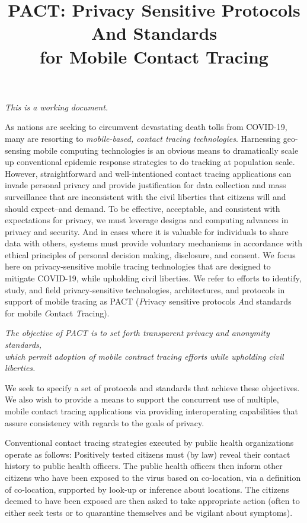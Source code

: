 \documentclass{article}
\title{{\Huge PACT\/}:   {\Huge P\/}rivacy Sensitive Protocols {\Huge A\/}nd Standards\\
for Mobile {\Huge C\/}ontact {\Huge T\/}racing }
\date{}
\begin{document}
\maketitle

\emph{This is a working document.}

As nations are seeking to circumvent devastating death tolls from COVID-19, many are resorting to \emph{mobile-based, contact tracing technologies}. Harnessing geo-sensing mobile computing technologies
is an obvious means to dramatically scale up conventional epidemic response strategies
to do tracking at population scale. However, straightforward and well-intentioned contact tracing applications can invade personal privacy and provide justification for data collection and mass surveillance that are inconsistent with the civil liberties that citizens will and should expect--and demand. To be effective, acceptable, and consistent with expectations for privacy, we must leverage designs and computing advances in privacy and security. And in cases where it is valuable for individuals to share data with others, systems must provide voluntary mechanisms in accordance with ethical principles of personal decision making, disclosure, and consent. We focus here on privacy-sensitive mobile tracing technologies that are designed to mitigate COVID-19, while upholding civil liberties.  We refer to efforts to identify, study, and field  privacy-sensitive technologies, architectures, and protocols in support of mobile tracing as PACT (\emph{P}rivacy sensitive protocols \emph{A}nd standards for mobile \emph{C}ontact \emph{T}racing).

\begin{center}
\emph{The objective of PACT is to set forth transparent privacy and
  anonymity standards,\\
  which permit adoption of mobile contract tracing efforts while upholding civil liberties.}
\end{center}

We seek to specify a set of protocols and standards that achieve
these objectives. We also wish to provide a means to support the concurrent use of multiple, mobile contact tracing applications via providing interoperating capabilities that assure consistency with regards to the goals of privacy.

Conventional contact tracing strategies executed by public health organizations operate as follows: Positively tested citizens must (by law) reveal their contact history to public health officers. The public health officers then inform other citizens who have been exposed to the virus based on co-location, via a definition of co-location, supported by look-up or inference about locations. The citizens deemed to have been exposed are then asked to take appropriate action (often to either seek tests or to quarantine
themselves and be vigilant about symptoms).  
\end{document}
